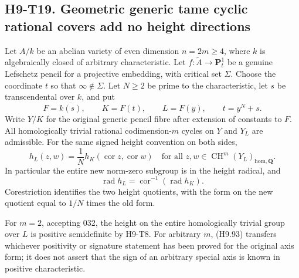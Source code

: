 
\subsection*{H9-T19. Geometric generic tame cyclic rational covers add no height directions}

\begin{theorem}[H9-T19]
Let $A/k$ be an abelian variety of even dimension $n=2m\ge4$,
where $k$ is algebraically closed of arbitrary characteristic.
Let $f:\widetilde A\to\mathbf P^1_t$ be a genuine Lefschetz
pencil for a projective embedding, with critical set $\Sigma$.
Choose the coordinate $t$ so that $\infty\notin\Sigma$.
Let $N\ge2$ be prime to the characteristic, let $s$ be
transcendental over $k$, and put
\[
 F=\overline{k(s)},\qquad K=F(t),\qquad L=F(y),
                   \qquad t=y^N+s.
\]
Write $Y/K$ for the original generic pencil fibre after extension
of constants to $F$. All homologically trivial rational
codimension-$m$ cycles on $Y$ and $Y_L$ are admissible. For the
same signed height convention on both sides,
\[
 h_L(z,w)=\frac1N h_K(\operatorname{cor}z,
                            \operatorname{cor}w)
 \quad\text{for all }z,w\in
                 \operatorname{CH}^m(Y_L)_{\mathrm{hom},\mathbf Q}.
                                                               \tag{H9.93}
\]
In particular the entire new norm-zero subgroup is in the height
radical, and
\[
 \operatorname{rad}h_L
       =\operatorname{cor}^{-1}(\operatorname{rad}h_K).
                                                               \tag{H9.94}
\]
Corestriction identifies the two height quotients, with the form
on the new quotient equal to $1/N$ times the old form.

For $m=2$, accepting 032, the height on the entire homologically
trivial group over $L$ is positive semidefinite by H9-T8.
For arbitrary $m$, (H9.93) transfers whichever positivity or
signature statement has been proved for the original axis form;
it does not assert that the sign of an arbitrary special axis is
known in positive characteristic.
\end{theorem}

